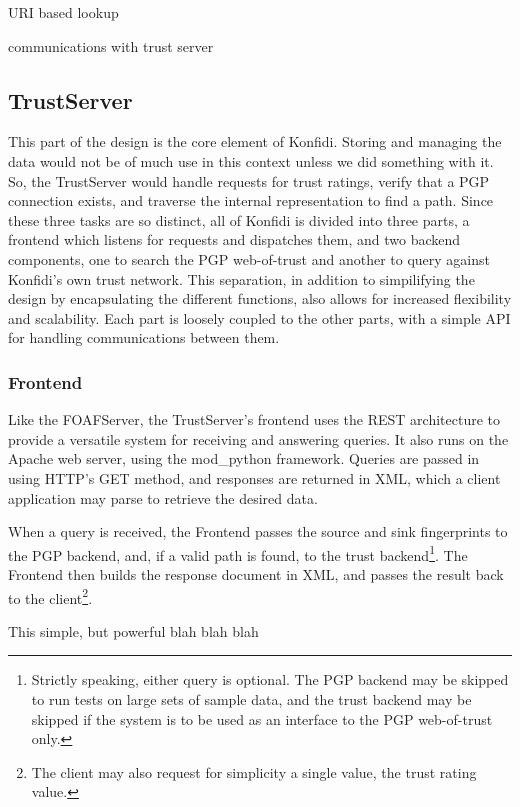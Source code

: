 \documentclass[onecolumn]{acm_proc_article-sp}
\begin{document}
URI based lookup

communications with trust server

\subsection{TrustServer}
This part of the design is the core element of Konfidi.  Storing and managing the data would not be of much use in this context unless we did something with it.  So, the TrustServer would handle requests for trust ratings, verify that a PGP connection exists, and traverse the internal representation to find a path.  Since these three tasks are so distinct, all of Konfidi is divided into three parts, a frontend which listens for requests and dispatches them, and two backend components, one to search the PGP web-of-trust and another to query against Konfidi's own trust network.  This separation, in addition to simpilifying the design by encapsulating the different functions, also allows for increased flexibility and scalability.  Each part is loosely coupled to the other parts, with a simple API for handling communications between them.

\subsubsection{Frontend}
Like the FOAFServer, the TrustServer's frontend uses the REST architecture to provide a versatile system for receiving and answering queries. 
It also runs on the Apache web server, using the mod\_python framework.  Queries are passed in using HTTP's GET method, and responses are returned in XML, which a client application may parse to retrieve the desired data.

When a query is received, the Frontend passes the source and sink fingerprints to the PGP backend, and, if a valid path is found, to the trust backend\footnote{Strictly speaking, either query is optional.  The PGP backend may be skipped to run tests on large sets of sample data, and the trust backend may be skipped if the system is to be used as an interface to the PGP web-of-trust only.}.  The Frontend then builds the response document in XML, and passes the result back to the client\footnote{The client may also request for simplicity a single value, the trust rating value.}.

This simple, but powerful blah blah blah
\end{document}
